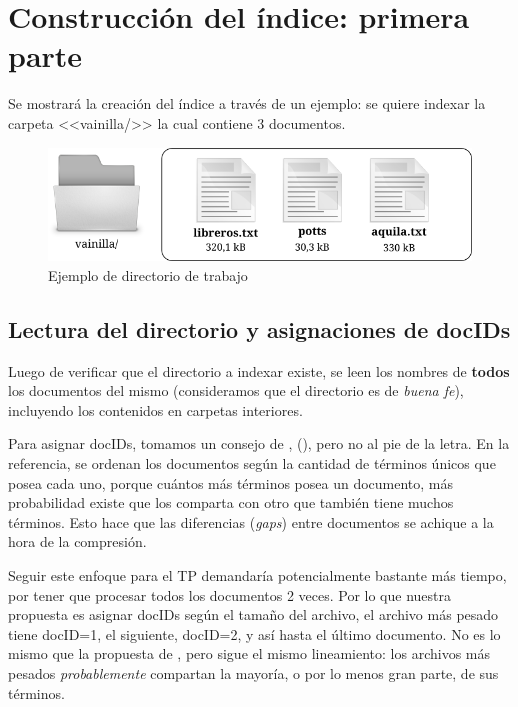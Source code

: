 \section{Construcción del índice: primera parte}

Se mostrará la creación del índice a través de un ejemplo: se quiere indexar la carpeta <<vainilla/>> la cual contiene 3 documentos.

\begin{figure}[!h]
\centering
    \includegraphics[scale=0.9]{./Images/vainillaDir.png}
\caption{Ejemplo de directorio de trabajo}
\label{fig:directorioTrabajo}
\end{figure}


\subsection{Lectura del directorio y asignaciones de docIDs}

Luego de verificar que el directorio a indexar existe, se leen los nombres de \textbf{todos} los documentos del mismo (consideramos que el directorio es de \textit{buena fe}), incluyendo los contenidos en carpetas interiores. 

Para asignar docIDs, tomamos un consejo de \citet[p.~216]{Buettcher2010}, (\citeyear{Buettcher2010}), pero no al pie de la letra. En la referencia, se ordenan los documentos según la cantidad de términos únicos que posea cada uno, porque cuántos más términos posea un documento, más probabilidad existe que los comparta con otro que también tiene muchos términos. Esto hace que las diferencias (\textit{gaps}) entre documentos se achique a la hora de la compresión.

Seguir este enfoque para el TP demandaría potencialmente bastante más tiempo, por tener que procesar todos los documentos 2 veces. Por lo que nuestra propuesta es asignar docIDs según el tamaño del archivo, el archivo más pesado tiene docID=1, el siguiente, docID=2, y así hasta el último documento. No es lo mismo que la propuesta de \cite{Buettcher2010}, pero sigue el mismo lineamiento: los archivos más pesados \textit{probablemente} compartan la mayoría, o por lo menos gran parte, de sus términos.

